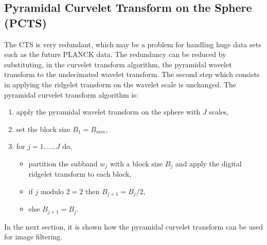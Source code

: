\subsection{Pyramidal Curvelet Transform on the Sphere (PCTS)}

The CTS is very redundant, which may be a problem for handling huge data sets such as the future PLANCK data. The redundancy 
can be reduced by substituting, in the curvelet transform algorithm, the pyramidal wavelet transform to the undecimated wavelet 
transform. The second step which consists in applying the ridgelet transform on the wavelet scale is unchanged. The pyramidal 
curvelet transform algorithm is:
\begin{enumerate}
\item apply the pyramidal wavelet transform on the sphere with $J$ scales,
\item set the block size $B_1 = B_{min}$,
\item for $j = 1, \ldots, J$ do,
\begin{itemize}
\item partition the subband $w_j$ with a block size $B_j$ and apply the digital ridgelet transform to each block,
\item if $j \mbox{ modulo } 2 = 2$ then $B_{j+1} = B_{j} / 2$,
\item else $B_{j+1} = B_{j}$.
\end{itemize}
\end{enumerate}
In the next section, it is shown how the pyramidal curvelet transform can be used for image filtering.




